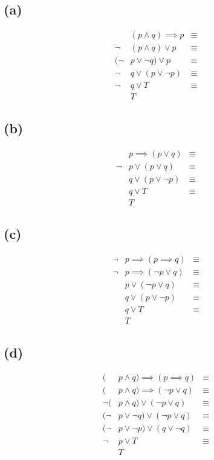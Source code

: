 \documentclass{article}
\begin{document}
\subsection{(a)}
\begin{align*}
	      & (p \land q) \implies p & \equiv \\
	\neg  & (p \land q) \lor p     & \equiv \\
	(\neg & p \lor \neg q) \lor p  & \equiv \\
	\neg  & q \lor (p \lor \neg p) & \equiv \\
	\neg  & q \lor T               & \equiv \\
	      & T
\end{align*}

\subsection{(b)}
\begin{align*}
	     & p \implies (p \lor q)  & \equiv \\
	\neg & p \lor (p \lor q)      & \equiv \\
	     & q \lor (p \lor \neg p) & \equiv \\
	     & q \lor T               & \equiv \\
	     & T
\end{align*}

\subsection{(c)}
\begin{align*}
	\neg & p \implies (p \implies q)  & \equiv \\
	\neg & p \implies (\neg p \lor q) & \equiv \\
	     & p \lor (\neg p \lor q)     & \equiv \\
	     & q \lor (p \lor \neg p)     & \equiv \\
	     & q \lor T                   & \equiv \\
	     & T
\end{align*}

\subsection{(d)}
\begin{align*}
	(      & p \land q) \implies (p \implies q)  & \equiv \\
	(      & p \land q) \implies (\neg p \lor q) & \equiv \\
	\neg ( & p \land q) \lor (\neg p \lor q)     & \equiv \\
	(\neg  & p \lor \neg q) \lor (\neg p \lor q) & \equiv \\
	(\neg  & p \lor \neg p) \lor (q \lor \neg q) & \equiv \\
	\neg   & p \lor T                            & \equiv \\
	       & T
\end{align*}
\end{document}
